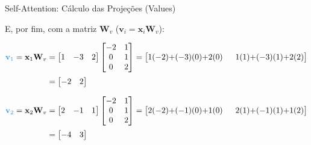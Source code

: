 \documentclass[aspectratio=169,xcolor=dvipsnames]{beamer}
\begin{document}
\begin{frame}[shrink=10]{Self-Attention: Cálculo das Projeções (\textcolor{vcolor}{Values})}

E, por fim, com a matriz $\mathbf{W}_v$ ($\mathbf{v}_i = \mathbf{x}_i \mathbf{W}_v$):

\begin{align*}
\textcolor{vcolor}{\mathbf{v}_1} = \mathbf{x}_1 \mathbf{W}_v &=
\begin{bmatrix} 1 & -3 & 2 \end{bmatrix}
\begin{bmatrix} -2 & 1 \\ 0 & 1 \\ 0 & 2 \end{bmatrix}
= \begin{bmatrix} 1(-2){+}(-3)(0){+}2(0) & \;\; 1(1){+}(-3)(1){+}2(2) \end{bmatrix} \\[2pt]
&= \begin{bmatrix} -2 & 2 \end{bmatrix}
\end{align*}

\vspace{4pt}

\begin{align*}
\textcolor{vcolor}{\mathbf{v}_2} = \mathbf{x}_2 \mathbf{W}_v &=
\begin{bmatrix} 2 & -1 & 1 \end{bmatrix}
\begin{bmatrix} -2 & 1 \\ 0 & 1 \\ 0 & 2 \end{bmatrix}
= \begin{bmatrix} 2(-2){+}(-1)(0){+}1(0) & \;\; 2(1){+}(-1)(1){+}1(2) \end{bmatrix} \\[2pt]
&= \begin{bmatrix} -4 & 3 \end{bmatrix}
\end{align*}

\end{frame}

\end{document}
